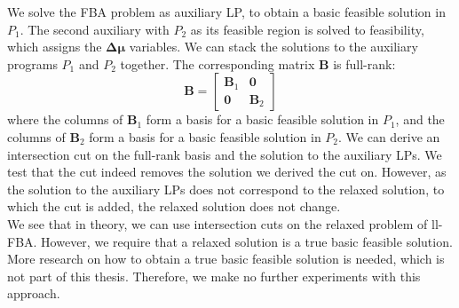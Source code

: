 We solve the \textsf{FBA} problem as auxiliary LP, to obtain a basic feasible solution in $P_1$. The second auxiliary with $P_2$ as its feasible region is solved to feasibility, which assigns the $\boldsymbol{\Delta \mu}$ variables. We can stack the solutions to the auxiliary programs $P_1$ and $P_2$ together. The corresponding matrix $\mathbf B$ is full-rank: 
\begin{equation*}
    \mathbf B = 
    \left[\begin{array}{cc} 
        \mathbf B_1 & \mathbf 0 \\
       \mathbf 0 & \mathbf B_2
    \end{array}\right]
\end{equation*}
 where the columns of $\mathbf B_1$ form a basis for a basic feasible solution in $P_1$, and the columns of $\mathbf B_2$ form a basis for a basic feasible solution in $P_2$.
We can derive an intersection cut on the full-rank basis and the solution to the auxiliary LPs. We test that the cut indeed removes the solution we derived the cut on. However, as the solution to the auxiliary LPs does not correspond to the relaxed solution, to which the cut is added, the relaxed solution does not change. \\
We see that in theory, we can use intersection cuts on the relaxed problem of \textsf{ll-FBA}. However, we require that a relaxed solution is a true basic feasible solution. More research on how to obtain a true basic feasible solution is needed, which is not part of this thesis. Therefore, we make no further experiments with this approach.

